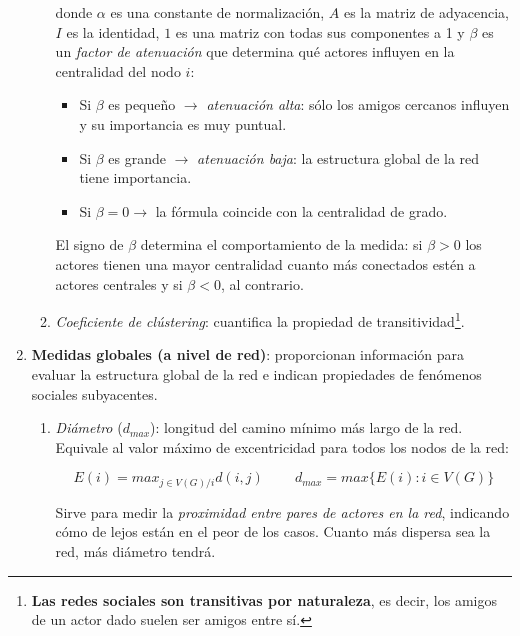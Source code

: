 \documentclass[10pt,spanish, landscape, twocolumn]{article}
\begin{document}
\begin{enumerate}[\color{tematres}{$\star$}]
\begin{enumerate}[---]
        donde $\alpha$ es una constante de normalización, $A$ es la matriz de adyacencia, $I$ es la identidad, $1$ es una matriz con todas sus componentes a 1 y $\beta$ es un \textit{\textcolor{tematres}{factor de atenuación}} que determina qué actores influyen en la centralidad del nodo $i$:
        \begin{itemize}
            \item Si $\beta$ es pequeño $\longrightarrow$ \textit{\textcolor{tematres}{atenuación alta}}: sólo los amigos cercanos influyen y su importancia es muy puntual.
            \item Si $\beta$ es grande $\longrightarrow$ \textit{\textcolor{tematres}{atenuación baja}}: la estructura global de la red tiene importancia.
            \item Si $\beta = 0 \longrightarrow$ la fórmula coincide con la centralidad de grado.
        \end{itemize}

        El signo de $\beta$ determina el comportamiento de la medida: si $\beta > 0$ los actores tienen una mayor centralidad cuanto más conectados estén a actores centrales y si $\beta < 0$, al contrario.

        \item \textit{\textcolor{tematres}{Coeficiente de clústering}}: cuantifica la propiedad de transitividad\footnote{\textbf{\textcolor{tematres}{Las redes sociales son transitivas por naturaleza}}, es decir, los amigos de un actor dado suelen ser amigos entre sí.}.
    \end{enumerate}

    \item \textbf{\textcolor{tematres}{Medidas globales (a nivel de red)}}: proporcionan información para evaluar la estructura global de la red e indican propiedades de fenómenos sociales subyacentes.

    \begin{enumerate}[---]
        \item \textit{\textcolor{tematres}{Diámetro}} ($d_{max}$): longitud del camino mínimo más largo de la red. Equivale al valor máximo de excentricidad para todos los nodos de la red:

        \begin{displaymath}
            E(i) = max_{j \in V (G)/i} d(i,j) \qquad\ d_{max} = max \{E(i): i \in V(G) \}
        \end{displaymath}

        Sirve para medir la \textit{\textcolor{tematres}{proximidad entre pares de actores en la red}}, indicando cómo de lejos están en el peor de los casos. Cuanto más dispersa sea la red, más diámetro tendrá.


\end{enumerate}
\end{enumerate}
\end{document}
